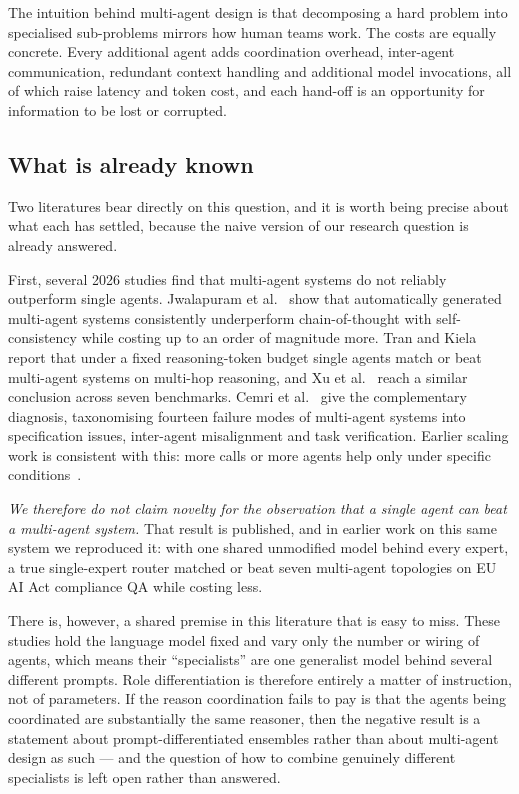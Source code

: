 \documentclass[journal,10pt,compsoc,onecolumn]{IEEEtran}
\begin{document}
The intuition behind multi-agent design is that decomposing a hard problem into
specialised sub-problems mirrors how human teams work. The costs are equally
concrete. Every additional agent adds coordination overhead, inter-agent
communication, redundant context handling and additional model invocations, all
of which raise latency and token cost, and each hand-off is an opportunity for
information to be lost or corrupted.

\subsection{What is already known}

Two literatures bear directly on this question, and it is worth being precise
about what each has settled, because the naive version of our research question
is already answered.

First, several 2026 studies find that multi-agent systems do not reliably
outperform single agents. Jwalapuram et al.~\cite{jwalapuram2026illusion} show
that automatically generated multi-agent systems consistently underperform
chain-of-thought with self-consistency while costing up to an order of magnitude
more. Tran and Kiela~\cite{tran2026singleagent} report that under a fixed
reasoning-token budget single agents match or beat multi-agent systems on
multi-hop reasoning, and Xu et al.~\cite{xu2026oneflow} reach a similar
conclusion across seven benchmarks. Cemri et al.~\cite{cemri2025mast} give the
complementary diagnosis, taxonomising fourteen failure modes of multi-agent
systems into specification issues, inter-agent misalignment and task
verification. Earlier scaling work is consistent with this: more calls or more
agents help only under specific conditions~\cite{li2024moreagents,
chen2024morellmcalls}.

\emph{We therefore do not claim novelty for the observation that a single agent
can beat a multi-agent system.} That result is published, and in earlier work on
this same system we reproduced it: with one shared unmodified model behind every
expert, a true single-expert router matched or beat seven multi-agent topologies
on EU AI Act compliance QA while costing less.

There is, however, a shared premise in this literature that is easy to miss.
These studies hold the language model fixed and vary only the number or wiring of
agents, which means their ``specialists'' are one generalist model behind
several different prompts. Role differentiation is therefore entirely a matter of
instruction, not of parameters. If the reason coordination fails to pay is that
the agents being coordinated are substantially the same reasoner, then the
negative result is a statement about prompt-differentiated ensembles rather than
about multi-agent design as such --- and the question of how to combine
genuinely different specialists is left open rather than answered.
\end{document}

